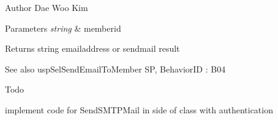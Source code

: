 \begin{DoxyAuthor}{Author}
Dae Woo Kim 
\end{DoxyAuthor}

\begin{DoxyParams}{Parameters}
{\em string} & memberid \\
\hline
\end{DoxyParams}
\begin{DoxyReturn}{Returns}
string emailaddress or sendmail result 
\end{DoxyReturn}
\begin{DoxySeeAlso}{See also}
usp\+Sel\+Send\+Email\+To\+Member SP, Behavior\+ID \+: B04 
\end{DoxySeeAlso}
\begin{DoxyRefDesc}{Todo}
\item[\hyperlink{a00001__todo000016}{Todo}]implement code for Send\+S\+M\+T\+P\+Mail in side of class with authentication \end{DoxyRefDesc}
